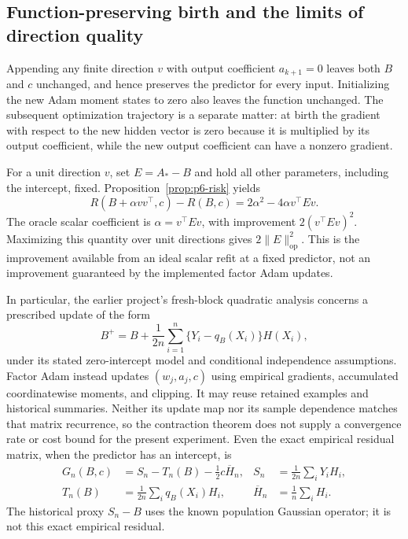 \subsection{Function-preserving birth and the limits of direction quality}

Appending any finite direction $v$ with output coefficient
$a_{k+1}=0$ leaves both $B$ and $c$ unchanged, and hence preserves the
predictor for every input. Initializing the new Adam moment states to
zero also leaves the function unchanged. The subsequent optimization
trajectory is a separate matter: at birth the gradient with respect to
the new hidden vector is zero because it is multiplied by its output
coefficient, while the new output coefficient can have a nonzero
gradient.

For a unit direction $v$, set $E=A_*-B$ and hold all other parameters,
including the intercept, fixed. Proposition~\ref{prop:p6-risk} yields
\begin{equation}
 R(B+\alpha vv^\top,c)-R(B,c)
 =2\alpha^2-4\alpha v^\top Ev.
 \label{eq:p6-direction-gain}
\end{equation}
The oracle scalar coefficient is $\alpha=v^\top Ev$, with improvement
$2(v^\top Ev)^2$. Maximizing this quantity over unit directions gives
$2\|E\|_{\mathrm{op}}^2$. This is the improvement available from an
ideal scalar refit at a fixed predictor, not an improvement guaranteed
by the implemented factor Adam updates.

In particular, the earlier project's fresh-block quadratic analysis
concerns a prescribed update of the form
\[
 B^+=B+\frac{1}{2n}\sum_{i=1}^n
       \{Y_i-q_B(X_i)\}H(X_i),
\]
under its stated zero-intercept model and conditional independence
assumptions. Factor Adam instead updates $(w_j,a_j,c)$ using empirical
gradients, accumulated coordinatewise moments, and clipping. It may
reuse retained examples and historical summaries. Neither its update
map nor its sample dependence matches that matrix recurrence, so the
contraction theorem does not supply a convergence rate or cost bound
for the present experiment. Even the exact empirical residual matrix,
when the predictor has an intercept, is
\begin{align*}
 G_n(B,c)&=S_n-T_n(B)-\tfrac12c\overline H_n,
 &S_n&=\frac1{2n}\sum_iY_iH_i,\\
 T_n(B)&=\frac1{2n}\sum_iq_B(X_i)H_i,
 &\overline H_n&=\frac1n\sum_iH_i.
\end{align*}
The historical proxy $S_n-B$ uses the known population Gaussian
operator; it is not this exact empirical residual.

